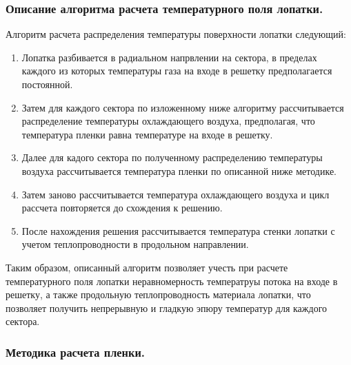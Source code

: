 \documentclass[a4paper,12pt]{article}
\begin{document}
    \subsubsection{Описание алгоритма расчета температурного поля лопатки.}
%    
    Алгоритм расчета распределения температуры поверхности лопатки следующий:
    \begin{enumerate}
        \item Лопатка разбивается в радиальном напрвлении на сектора, в пределах каждого из которых
        температуры газа на входе в решетку предполагается постоянной.
        \item Затем для каждого сектора по изложенному ниже алгоритму рассчитывается распределение температуры
        охлаждающего воздуха, предполагая, что температура пленки равна температуре на входе в решетку.
        \item Далее для кадого сектора по полученному распределению температуры воздуха рассчитывается
        температура пленки по описанной ниже методике.
        \item Затем заново рассчитывается температура охлаждающего воздуха и цикл рассчета повторяется до схождения к решению.
        \item После нахождения решения рассчитывается температура стенки лопатки с учетом теплопроводности в продольном направлении.
    \end{enumerate}
    Таким образом, описанный алгоритм позволяет учесть при расчете температурного поля лопатки неравномерность
    температруы  потока на входе в решетку, а также продольную теплопроводность материала лопатки, что позволяет
    получить непрерывную и гладкую эпюру температур для каждого сектора.
%    
    \subsubsection{Методика расчета пленки.}
%    
\end{document}
